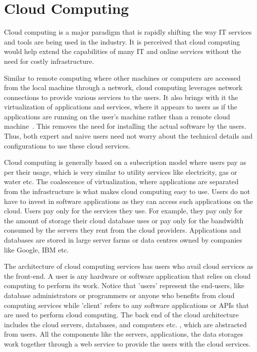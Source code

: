 \section{Cloud Computing} \label{s:cloudComputing}
Cloud computing is a major paradigm that is rapidly shifting the way \ac{IT}
services and tools are being used in the industry.  It is perceived that cloud
computing would help extend the capabilities of many \ac{IT} and online services
without the need for costly infrastructure.

Similar to remote computing where other machines or computers are accessed from
the local machine through a network,   cloud computing leverages network
connections to provide various services to the users.  It also brings with it
the virtualization of applications and services,   where it appears to users as
if the applications are running on the user's machine rather than a remote cloud
machine~\citep{cloudcomputingdefined}.  This removes the need for installing the
actual software by the users.  Thus,   both expert and naive users need not
worry about the technical details and configurations to use these cloud
services.

Cloud computing is generally based on a subscription model where users pay as
per their usage,   which is very similar to utility services like electricity,  
gas or water etc.  The coalescence of virtualization,   where applications are
separated from the infrastructure is what makes cloud computing easy to use.
Users do not have to invest in software applications as they can access such
applications on the cloud.  Users pay only for the services they use.  For
example,   they pay only for the amount of storage their cloud database uses or
pay only for the bandwidth consumed by the servers they rent from the cloud
providers.  Applications and databases are stored in large server farms or data
centres owned by companies like Google,  IBM etc.

The architecture of cloud computing services has users who avail cloud services
as the front-end. A user is any hardware or software application that relies on
cloud computing to perform its work. Notice that 'users' represent the
end-users,   like  database administrators or programmers or anyone who benefits
from cloud computing services while 'client' refers to any software applications
or \acp{API}  that are used to perform cloud computing. The back end of the
cloud architecture includes the cloud servers, databases,   and computers etc. ,
which are abstracted from users.  All the components like the servers,
applications, the data storages work together through a web service to provide
the users with the cloud services.

